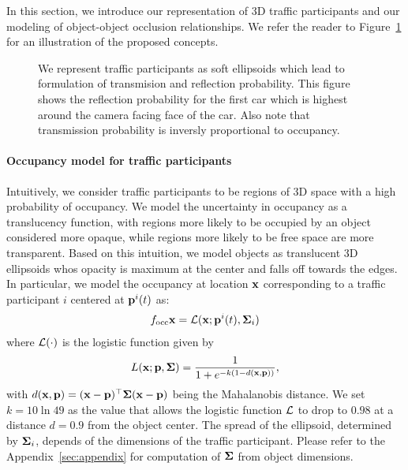 
In this section, we introduce our representation of 3D traffic participants and our modeling of object-object occlusion relationships. We refer the reader to Figure~\ref{fig:reflectiontransimission} for an illustration of the proposed concepts.

\begin{figure}
  \usetikzlibrary{calc}
  \centering
  \begin{tikzpicture}
    
  \end{tikzpicture}
  \caption{We represent traffic participants as soft ellipsoids which lead to formulation of transmision and reflection probability. This figure shows the reflection probability for the first car which is highest around the camera facing face of the car. Also note that transmission probability is inversly proportional to occupancy.}
  \label{fig:reflectiontransimission}
\end{figure}



\paragraph{Occupancy model for traffic participants}
Intuitively, we consider traffic participants to be regions of 3D space with a high probability of occupancy. We model the uncertainty in occupancy as a translucency function, with regions more likely to be occupied by an object considered more opaque, while regions more likely to be free space are more transparent. Based on this intuition, we model objects as translucent 3D ellipsoids whos opacity is maximum at the center and falls off towards the edges. In particular, we model the occupancy at location $\bx$ corresponding to a traffic participant $i$ centered at $\pos{i}{t}$ as:
\begin{align}
  f_{\text{occ}}{\bx} = \cL(\bx; \pos{i}{t}, \bSigma_i)
\end{align}
where $\cL(\cdot)$ is the logistic function given by
\begin{align}
  L(\bx; \bp, \bSigma) = \frac{1}{1 + e^{-k(1 - d(\mathbf{x},\bp))}},
\end{align}
with $d(\bx, \bp) = (\bx-\bp)^\top\bSigma(\bx-\bp)$ being the Mahalanobis distance. We set $k = 10\ln{49}$ as the value that allows the logistic function $\cL$ to drop to $0.98$ at a distance $d = 0.9$ from the object center. The spread of the ellipsoid, determined by $\bSigma_i$, depends of the dimensions of the traffic participant. Please refer to the Appendix~\ref{sec:appendix} for computation of $\bSigma$ from object dimensions.


